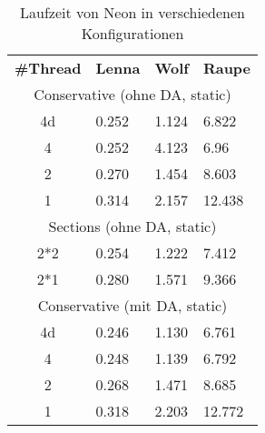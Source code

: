 \begin{table}[H]
\centering
\begin{tabular}{c p{2cm}p{2cm}p{2cm}}
\toprule
\textbf{\#Thread} & \textbf{Lenna} & \textbf{Wolf} & \textbf{Raupe} \\

\cmidrule(r){1-4}

\multicolumn{4}{c}{Conservative (ohne DA, static)} 	\\
4d 	& 0.252		&1.124		&6.822			\\
4 	& 0.252		&4.123		&6.96 		 	\\
2	& 0.270		&1.454		&8.603			\\
1	& 0.314		&2.157		&12.438 			\\

\cmidrule(r){1-4}

\multicolumn{4}{c}{Sections (ohne DA, static)} 		\\
2*2 	& 0.254		&1.222		&7.412 		 	\\
2*1	& 0.280		&1.571		&9.366 		 	\\

\cmidrule(r){1-4}

\multicolumn{4}{c}{Conservative (mit DA, static)}	\\
4d	& 0.246		& 1.130		& 6.761			\\
4 	& 0.248		&1.139		& 6.792		 	\\
2	& 0.268		&1.471		& 8.685 		 	\\
1	& 0.318		&2.203		&12.772			\\

\bottomrule
\end{tabular}
\caption{Laufzeit von Neon in verschiedenen Konfigurationen}
\label{tab:NEON_runtime}
\end{table}


